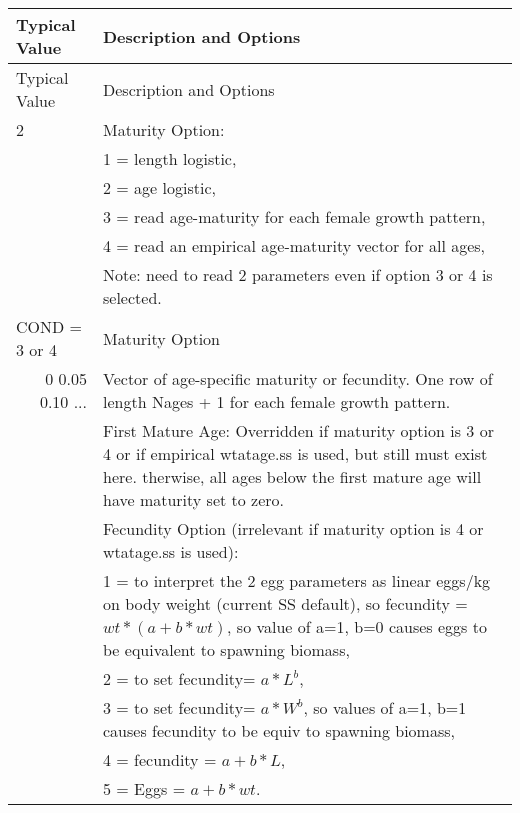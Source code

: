\begin{longtable}{p{0.5cm} p{2cm} p{13cm}}
	\hline	
	\multicolumn{2}{l}{Typical Value} & Description and Options\Tstrut\Bstrut\\
	\hline
	\endfirsthead

	\hline
	\multicolumn{2}{l}{Typical Value} & Description and Options\Tstrut\Bstrut\\
	\hline
	\endhead
	\hline

	\endfoot
	
	\endlastfoot

	2 & & Maturity Option: \Tstrut\\
	  & & 1 = length logistic,\\
	  & & 2 = age logistic,\\
	  & & 3 = read age-maturity for each female growth pattern,\\
	  & & 4 = read an empirical age-maturity vector for all ages,\\
	  & & Note: need to read 2 parameters even if option 3 or 4 is selected.\Bstrut \\
	\hline

	\multicolumn{2}{l}{COND = 3 or 4} & Maturity Option\Tstrut\\
	\multicolumn{2}{r}{0 0.05 0.10 ...} & Vector of age-specific maturity or fecundity.  One row of length Nages + 1 for each female growth pattern. \Bstrut\\
	\hline
	
	\Tstrut 1  & & First Mature Age: Overridden if maturity option is 3 or 4 or if empirical wtatage.ss is used, but still must exist here.  therwise, all ages below the first mature age will have maturity set to zero.\Bstrut\\
	\hline	  

	\Tstrut 1 & & Fecundity Option (irrelevant if maturity option is 4 or wtatage.ss is used):\\
	  & & 1 = to  interpret the 2 egg parameters as linear eggs/kg on body weight (current SS default),  so fecundity = $wt * (a+b*wt)$,  so value of a=1, b=0 causes eggs to be equivalent to spawning biomass,\\
	  & & 2 = to set fecundity= $a*L^ b$,\\
	  & & 3 = to set fecundity= $a*W^ b$, so values of a=1, b=1 causes fecundity to be equiv to spawning biomass,\\
	  & & 4 = fecundity = $a+b*L$,\\
	  & & 5 = Eggs = $a+b*wt$.\Bstrut\\
	\hline
\end{longtable}


